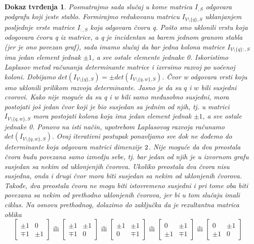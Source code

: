 \documentclass[11pt]{article}
\newtheorem*{custom_proof}{Dokaz tvrđenja}
\begin{document}
\begin{custom_proof}
		Posmatrajmo sada slučaj u kome matrica $I_{,S}$ odgovara podgrafu koji jeste stablo. Formirajmo redukovanu matricu $I_{V \setminus \{q\},S}$ uklanjanjem posljednje vrste matrice $I_{:,S}$ koja odgovara čvoru q. 
	    Pošto smo uklonili vrstu koja odogovara čvoru q iz matrice, a q je incidentan sa barem jednom granom stabla (jer je ono povezan graf), sada imamo slučaj da bar jedna kolona matrice $I_{V \setminus \{q\}:,S}$
		ima jedan element jednak $\pm 1$, a sve ostale elemente jednake 0. Iskoristimo Laplasov metod računanja determinante matrice i izvrsimo razvoj po uočenoj koloni.
		Dobijamo $det(I_{V \setminus \{q\},S}) = \pm det(I_{V \setminus \{q,w\},S})$. Čvor w odgovara vrsti koju smo uklonili prilikom razvoja determinante.
		Jasno je da su $q$ i $w$ bili susjedni cvorovi. 
		Kako nije moguće da su q i w bili samo međusobno susjedni, mora postojati još jedan čvor koji je bio susjedan sa jednim od njih, tj. u matrici $I_{V \setminus \{q,w\},S}$ mora postojati kolona koja ima jedan element
		jednak $\pm 1$, a sve ostale jednake 0. Ponovo na isti način, upotrebom Laplasovog razvoja računamo $det(I_{V \setminus \{q,w\},S})$. 
		Ovaj iterativni postupak ponavljamo sve dok ne dođemo do determinante koja odgovara matrici dimenzije $2 \time 2$. 
		Nije moguće da dva preostala čvora budu povezana samo izmedju sebe, tj. bar jedan od njih je u izvornom grafu susjedan sa nekim od uklonjenjih čvorova.
		Ukoliko preostala dva čvora nisu susjedna, onda i drugi čvor mora biti susjedan sa nekim od uklonjenih čvorova.
		Takođe, dva preostala čvora ne mogu biti istovremeno susjedni i pri tome oba biti povezana sa nekim od prethodno uklonjenih čvorova, jer bi u tom slučaju imali ciklus.
		Na osnovu prethodnog, dolazimo do zaključka da je rezultantna matrica oblika 
		\[
		\begin{bmatrix} \pm 1 &  0 \\ \mp 1 & \pm 1 \end{bmatrix}
		\text{ ili } \begin{bmatrix} \pm 1 &  \pm 1 \\ \mp 1 & 0 \end{bmatrix}
		\text{ ili } \begin{bmatrix} \pm 1 &  \pm 1 \\ 0 &  \mp 1 \end{bmatrix}
		\text{ ili } \begin{bmatrix} 0 & \pm 1 \\ \pm 1 & \mp 1 \end{bmatrix}
		\text{ ili } \begin{bmatrix} 0 &  \pm 1 \\ \pm 1 & 0 \end{bmatrix}
\]
\end{custom_proof}
\end{document}
